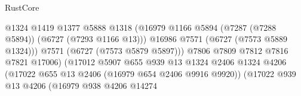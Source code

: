 \begin{lexlean}{RustCore}
\begin{coremodule}
                                                      @1324
                                                      @1419
                                                      @1377
                                                      @5888
                                                      @1318
                                                      (@16979
                                                        @1166
                                                        @5894
                                                        (@7287 (@7288 @5894))
                                                        (@6727 (@7293 @1166 @13)))
                                                      @16986
                                                      @7571
                                                      (@6727 (@7573 @5889 @1324)))
                                                    @7571
                                                    (@6727 (@7573 @5879 @5897)))
                                                  @7806
                                                  @7809
                                                  @7812
                                                  @7816
                                                  @7821
                                                  @17006)
                                                (@17012
                                                  @5907
                                                  @655
                                                  @939
                                                  @13
                                                  @1324
                                                  @2406
                                                  @1324
                                                  @4206
                                                  (@17022
                                                    @655
                                                    @13
                                                    @2406
                                                    (@16979 @654 @2406 @9916 @9920))
                                                  (@17022
                                                    @939
                                                    @13
                                                    @4206
                                                    (@16979
                                                      @938
                                                      @4206
                                                      @14274

\end{coremodule}
\end{lexlean}
